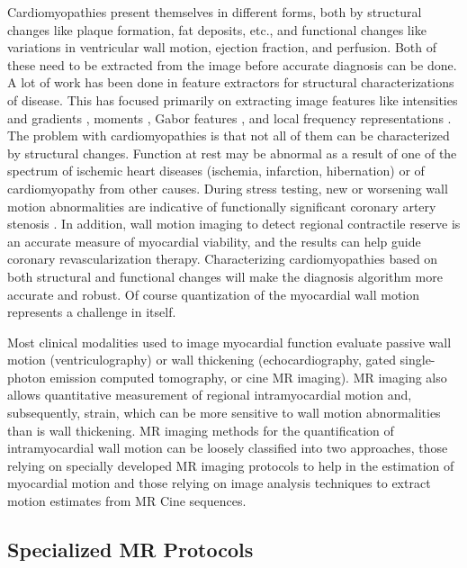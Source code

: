 Cardiomyopathies present themselves in different forms, both by structural changes like plaque formation, fat deposits, etc., and functional changes like variations in ventricular wall motion, ejection fraction, and perfusion. Both of these need to be extracted from the image before accurate diagnosis can be done. A lot of work has been done in feature extractors for structural characterizations of disease. This has focused primarily on extracting image features like intensities and gradients \cite{ intgrad}, moments \cite{ hammer,  moments}, Gabor features \cite{ manju96}, and local frequency representations \cite{ locfreq}. The problem with cardiomyopathies is that not all of them can be characterized by structural changes. Function at rest may be abnormal as a result of one of the spectrum of ischemic heart diseases (ischemia, infarction, hibernation) or of cardiomyopathy from other causes. During stress testing, new or worsening wall motion abnormalities are indicative of functionally significant coronary artery stenosis \cite{smart2000das}. In addition, wall motion imaging to detect regional contractile reserve is an accurate measure of myocardial viability, and the results can help guide coronary revascularization therapy. Characterizing cardiomyopathies based on both structural and functional changes will make the diagnosis algorithm more accurate and robust. Of course quantization of the myocardial wall motion represents a challenge in itself. 

Most clinical modalities used to image myocardial function evaluate passive wall motion (ventriculography) or wall thickening (echocardiography, gated single-photon emission computed tomography, or cine MR imaging). MR imaging also allows quantitative measurement of regional intramyocardial motion and, subsequently, strain, which can be more sensitive to wall motion abnormalities than is wall thickening. MR imaging methods for the quantification of intramyocardial wall motion can be loosely classified into two approaches, those relying on specially developed MR imaging protocols to help in the estimation of myocardial motion and those relying on image analysis techniques to extract motion estimates from MR Cine sequences.

\subsection{Specialized MR Protocols}
